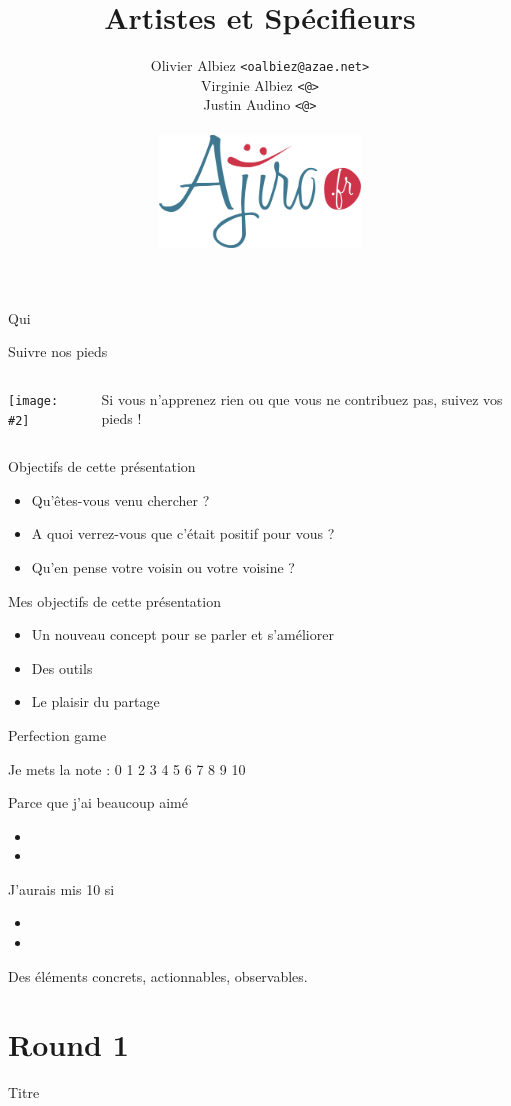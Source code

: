 \documentclass{beamer}
\title{Artistes et Spécifieurs}
\author{
  Olivier Albiez \texttt{<oalbiez@azae.net>} \\
  Virginie Albiez \texttt{<@>} \\
  Justin Audino \texttt{<@>} \\
  \\[5mm]
  \includegraphics[height=3cm]{includes/logo-ajiro} \hfill
}
\newcommand\twocolumns[3]{
  \FPeval{\leftsize}{#1}
  \FPeval{\rightsize}{1 - #1}

  \begin{columns}
    \begin{column}{\leftsize\textwidth}
      #2
    \end{column}
    \begin{column}{\rightsize\textwidth}
      #3
    \end{column}
  \end{columns}
}
\newcommand{\singleimage}[2][\textwidth]{ \center \texttt{[image: \#2]} }
\begin{document}
\frame{\titlepage}


\begin{frame}{Qui}
\end{frame}


\begin{frame}{Suivre nos pieds}
  \twocolumns{0.3}{
    \singleimage{includes/foots.png}
  }{
    \Large{Si vous n’apprenez rien ou que vous ne contribuez pas, suivez vos pieds !}
  }
\end{frame}


\begin{frame}{Objectifs de cette présentation}
  \begin{itemize}[<+->]
    \item Qu'êtes-vous venu chercher ?
    \item A quoi verrez-vous que c'était positif pour vous ?
    \item Qu'en pense votre voisin ou votre voisine ?
  \end{itemize}
\end{frame}


\begin{frame}{Mes objectifs de cette présentation}
  \begin{itemize}[<+->]
    \item Un nouveau concept pour se parler et s'améliorer
    \item Des outils
    \item Le plaisir du partage
  \end{itemize}
\end{frame}


\begin{frame}{Perfection game}

  \begin{block}{Je mets la note : }
    0 1 2 3 4 5 6 \alert{7} 8 9 10
  \end{block}
  \begin{block}{Parce que j'ai beaucoup aimé}
      \begin{itemize}
        \item
        \item
      \end{itemize}
  \end{block}
  \begin{block}{J'aurais mis 10 si}
      \begin{itemize}
        \item
        \item
      \end{itemize}
  \end{block}


    Des éléments concrets, actionnables, observables.
\end{frame}


\section{Round 1}


\begin{frame}{Titre}
\end{frame}
\end{document}
